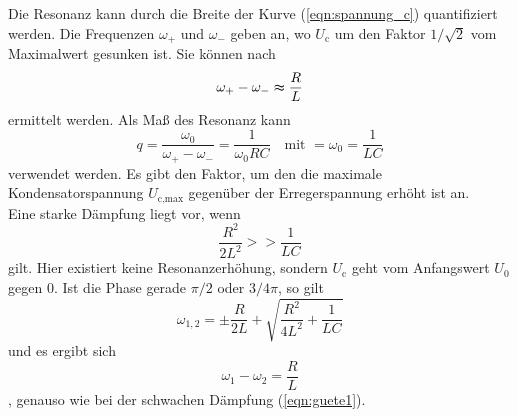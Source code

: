 Die Resonanz kann durch die Breite der Kurve (\autoref{eqn:spannung_c}) quantifiziert werden.
Die Frequenzen $\omega_+$ und $\omega_-$ geben an, wo $U_\text{c}$ um den Faktor $1/\sqrt{2}$ vom Maximalwert gesunken ist.
Sie können nach
\begin{equation}
    \omega_+ - \omega_- \thickapprox \frac{R}{L}
    \label{eqn:guete1}
\end{equation}
ermittelt werden. Als Maß des Resonanz kann 
\begin{equation}
    q = \frac{\omega_0}{\omega_+ - \omega_-} = \frac{1}{\omega_0RC} \quad \text{mit } = \omega_0 = \frac{1}{LC}
\end{equation}
verwendet werden. Es gibt den Faktor, um den die maximale Kondensatorspannung $U_\text{c,max}$ gegenüber der Erregerspannung erhöht ist an.
\\
Eine starke Dämpfung liegt vor, wenn
\begin{equation*}
    \frac{R^2}{2L^2} >> \frac{1}{LC}
\end{equation*}
gilt. Hier existiert keine Resonanzerhöhung, sondern $U_\text{c}$ geht vom Anfangswert $U_0$ gegen 0.
Ist die Phase gerade $\pi/2$ oder $3/4 \pi$, so gilt
\begin{equation}
    \omega_{1,2} = \pm \frac{R}{2L} + \sqrt{\frac{R^2}{4L^2} + \frac{1}{LC}} 
\end{equation}
und es ergibt sich
\begin{equation}
    \omega_1 - \omega_2 = \frac{R}{L}
    \label{eqn:breite}
\end{equation}
, genauso wie bei der schwachen Dämpfung (\autoref{eqn:guete1}).